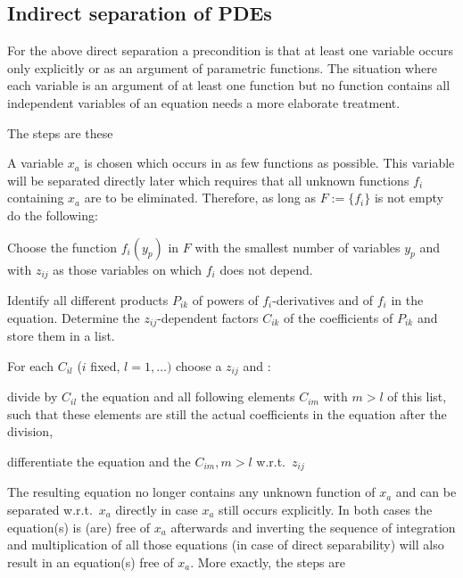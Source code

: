 \documentclass[12pt]{article}
\begin{document}
\subsection{Indirect separation of PDEs}
For the above direct separation a precondition is that at least one
variable occurs only explicitly or as an argument of parametric
functions.  The situation where each variable is an argument of at least
one function but no function contains all independent variables of an
equation needs a more elaborate treatment.

The steps are these 
\begin{description}
 \item A variable $x_a$ is chosen which occurs in as few functions as possible.
 This variable will be separated directly later which
 requires that all unknown functions $f_i$ containing $x_a$ are to be
 eliminated. Therefore, as long as $F:=\{f_i\}$ is not empty do the following:
 \begin{description}
  \item Choose the function $f_i(y_p)$ in $F$ with the smallest number of
  variables $y_p$ and with $z_{ij}$ as those variables on which $f_i$ does 
  not depend.
  \item Identify all different products $P_{ik}$ of powers of 
  $f_i$-derivatives and of $f_i$ in the equation. 
  Determine the $z_{ij}$-dependent factors $C_{ik}$ of the coefficients 
  of $P_{ik}$ and store them in a list.
  \item For each $C_{il}$ ($i$ fixed, $l=1,\ldots)$ choose a $z_{ij}$ and :
  \begin{description}
   \item divide by $C_{il}$ the equation and all following elements 
         $C_{im}$ with $m>l$ of this list, such that these elements are
         still the actual coefficients in the equation after the division,
   \item differentiate the equation and the $C_{im}, m>l$ w.r.t.\ $z_{ij}$
  \end{description}
 \end{description}
 \item The resulting equation no longer contains any unknown function of $x_a$
 and can be separated w.r.t.\ $x_a$ directly in case $x_a$ still occurs
 explicitly. In both cases the equation(s) is (are) free of $x_a$ afterwards 
 and inverting the sequence of integration and multiplication 
 of all those equations (in case of direct separability) will also result
 in an equation(s) free of $x_a.$ More exactly, the steps are

\end{description}
\end{document}
